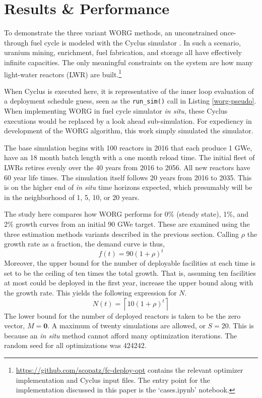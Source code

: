 \section{Results \& Performance}
\label{results}

To demonstrate the three variant WORG methods, an unconstrained
once-through fuel cycle is modeled with the Cyclus simulator
\cite{DBLP:journals/corr/HuffGCFMOSSW15}. In such a scenario, uranium
mining, enrichment, fuel fabrication, and storage all have effectively
infinite capacities. The only meaningful constraints on the system are
how many light-water reactors (LWR) are
built.\footnote{\url{https://github.com/scopatz/fc-deploy-opt}
contains the relevant optimizer implementation and Cyclus input files.
The entry point for the implementation discussed in this paper is the
`cases.ipynb' notebook.}

When Cyclus is executed here, it is representative of the inner loop
evaluation of a deployment schedule guess, seen as the \texttt{run\_sim()}
call in Listing \ref{worg-pseudo}. When implementing WORG in fuel cycle
simulator \emph{in situ}, these Cyclus executions would be replaced by
a look ahead sub-simulation. For expediency in development of the WORG
algorithm, this work simply simulated the simulator.

The base simulation begins with 100 reactors in 2016 that each produce
1 GWe, have an 18 month batch length with a one month reload time.
The initial fleet of LWRs retires evenly over the 40 years from 2016 to
2056. All new reactors have 60 year life times.  The simulation itself
follows 20 years from 2016 to 2035. This is on the higher end of
\emph{in situ} time horizons expected, which presumably
will be in the neighborhood of 1, 5, 10, or 20 years.

The study here compares how WORG performs for 0\% (steady state), 1\%,
and 2\% growth curves from an initial 90 GWe target. These are examined
using the three estimation methods variants described in the previous section.
Calling $\rho$ the growth rate as a
fraction, the demand curve is thus,
\begin{equation}
\label{f-rate}
f(t) = 90 (1 + \rho)^t
\end{equation}
Moreover, the upper bound for the number of deployable facilities at
each time is set to be the ceiling of ten times the total growth.
That is, assuming ten facilities at most could be deployed in the first
year, increase the upper bound along with the growth rate.  This yields
the following expression for $N$.
\begin{equation}
\label{n-rate}
N(t) = \left\lceil 10 (1 + \rho)^t\right\rceil
\end{equation}
The lower bound for the number of deployed reactors is taken to be the
zero vector, $M = \mathbf{0}$.  A maximum of twenty simulations are allowed,
or $S = 20$.
This is because an \emph{in situ} method cannot afford many optimization
iterations. The random seed for all optimizations was 424242.

